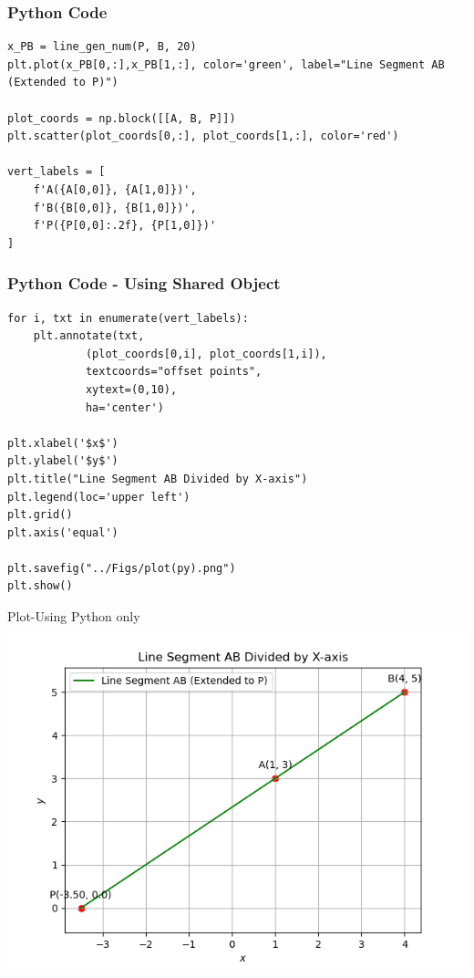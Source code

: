 \documentclass{beamer}
\begin{document}
\begin{frame}[fragile]
    \frametitle{Python Code}
    \begin{lstlisting}
x_PB = line_gen_num(P, B, 20)
plt.plot(x_PB[0,:],x_PB[1,:], color='green', label="Line Segment AB (Extended to P)")

plot_coords = np.block([[A, B, P]])
plt.scatter(plot_coords[0,:], plot_coords[1,:], color='red')

vert_labels = [
    f'A({A[0,0]}, {A[1,0]})',
    f'B({B[0,0]}, {B[1,0]})',
    f'P({P[0,0]:.2f}, {P[1,0]})'
]
\end{lstlisting}
\end{frame}

\begin{frame}[fragile]
    \frametitle{Python Code - Using Shared Object}
    \begin{lstlisting}
for i, txt in enumerate(vert_labels):
    plt.annotate(txt,
            (plot_coords[0,i], plot_coords[1,i]),
            textcoords="offset points",
            xytext=(0,10),
            ha='center')

plt.xlabel('$x$')
plt.ylabel('$y$')
plt.title("Line Segment AB Divided by X-axis")
plt.legend(loc='upper left')
plt.grid()
plt.axis('equal')

plt.savefig("../Figs/plot(py).png")
plt.show()
    \end{lstlisting}
\end{frame}


\begin{frame}{Plot-Using Python only}
    \centering
    \includegraphics[width=\columnwidth, height=0.8\textheight, keepaspectratio]{Figs/plot(py).png}     
\end{frame}
\end{document}
